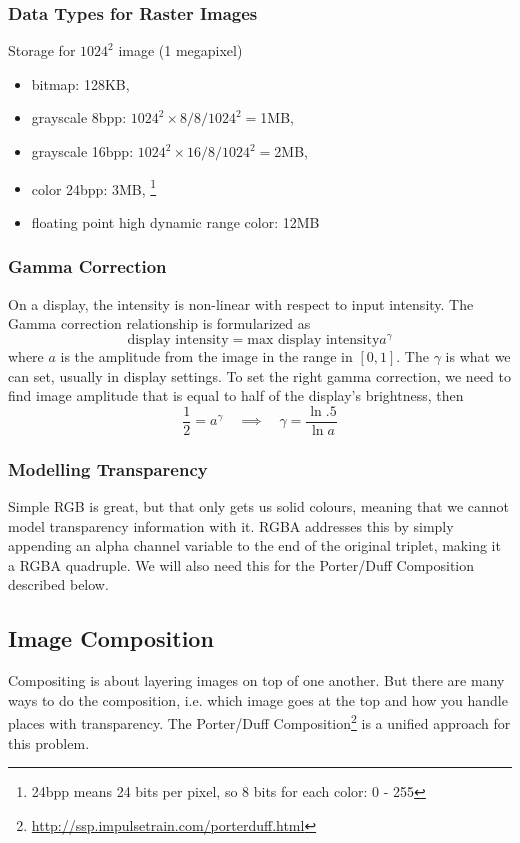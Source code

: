 \documentclass[11pt]{article}
\begin{document}
\subsubsection{Data Types for Raster Images}
Storage for $1024^2$ image (1 megapixel)
\begin{itemize}
	\item bitmap: 128KB, 
	\item grayscale 8bpp: $1024^2 \times 8 / 8 / 1024^2 = $1MB, 
	\item grayscale 16bpp: $1024^2 \times 16 / 8 / 1024^2 = $2MB, 
	\item color 24bpp: 3MB, \footnote{24bpp means 24 bits per pixel, so 8 bits for each color: 0 - 255}
	\item floating point high dynamic range color: 12MB
\end{itemize}

\subsubsection{Gamma Correction}
On a display, the intensity is non-linear with respect to input intensity. The Gamma correction relationship is formularized as 
\begin{equation}
	\text{display intensity} = \text{max display intensity} a^\gamma
\end{equation}
where $a$ is the amplitude from the image in the range in $[0, 1]$. The $\gamma$ is what we can set, usually in display settings. To set the right gamma correction, we need to find image amplitude that is equal to half of the display's brightness, then
\begin{equation}
	\frac{1}{2} = a^\gamma \quad 
	\implies \quad
	\gamma = \frac{\ln .5}{\ln a}
\end{equation}

\subsubsection{Modelling Transparency}
Simple RGB is great, but that only gets us solid colours, meaning that we cannot model transparency information with it. RGBA addresses this by simply appending an alpha channel variable to the end of the original triplet, making it a RGBA quadruple. We will also need this for the Porter/Duff Composition described below. 

\subsection{Image Composition}
Compositing is about layering images on top of one another. But there are many ways to do the composition, i.e. which image goes at the top and how you handle places with transparency. The Porter/Duff Composition\footnote{\url{http://ssp.impulsetrain.com/porterduff.html}} is a unified approach for this problem. 
\end{document}
